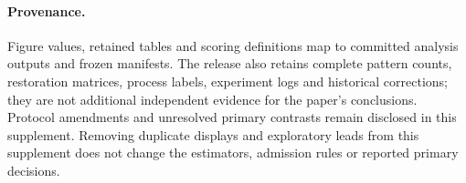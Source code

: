 \paragraph{Provenance.}\label{app:figsrc} Figure values, retained tables and scoring definitions map to committed analysis outputs and frozen manifests. The release also retains complete pattern counts, restoration matrices, process labels, experiment logs and historical corrections; they are not additional independent evidence for the paper's conclusions. Protocol amendments and unresolved primary contrasts remain disclosed in this supplement. Removing duplicate displays and exploratory leads from this supplement does not change the estimators, admission rules or reported primary decisions.

